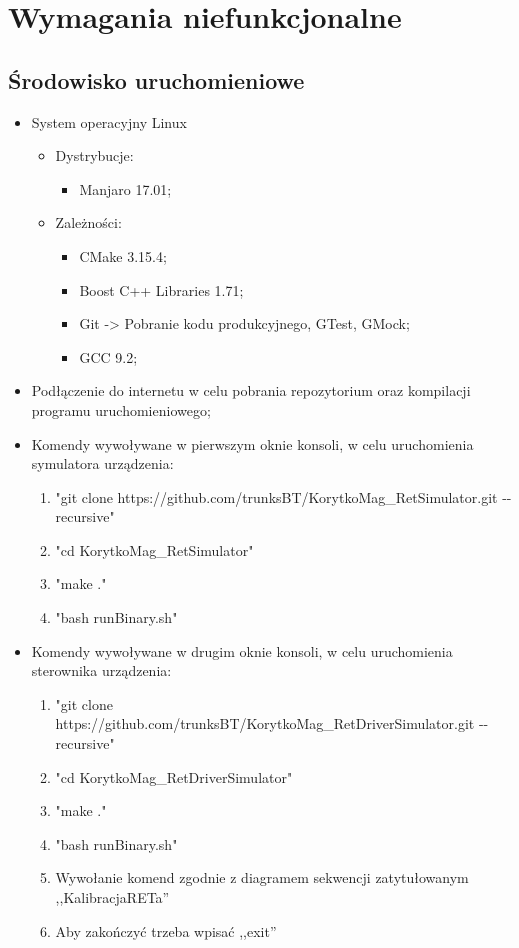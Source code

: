 \chapter{Wymagania niefunkcjonalne}
\section{Środowisko uruchomieniowe}
	\begin{itemize}
		\item System operacyjny Linux
			\begin{itemize}
				\item Dystrybucje:
				\begin{itemize}
					\item Manjaro 17.01;
				\end{itemize}
				\item Zależności:
					\begin{itemize}
						\item CMake 3.15.4;
						\item Boost C++ Libraries 1.71;
						\item Git -> Pobranie kodu produkcyjnego, GTest, GMock;
						\item GCC 9.2;
					\end{itemize}
			\end{itemize}
		\item Podłączenie do internetu w celu pobrania repozytorium oraz kompilacji programu uruchomieniowego;
		\item Komendy wywoływane w pierwszym oknie konsoli, w celu uruchomienia symulatora urządzenia:
		\begin{enumerate}
			\item "git clone https://github.com/trunksBT/KorytkoMag\_RetSimulator.git -{}-recursive"
			\item "cd KorytkoMag\_RetSimulator"
			\item "make ."
			\item "bash runBinary.sh"
		\end{enumerate}
		\item Komendy wywoływane w drugim oknie konsoli, w celu uruchomienia sterownika urządzenia:
		\begin{enumerate}
			\item "git clone https://github.com/trunksBT/KorytkoMag\_RetDriverSimulator.git -{}-recursive"
			\item "cd KorytkoMag\_RetDriverSimulator"
			\item "make ."
			\item "bash runBinary.sh"
			\item Wywołanie komend zgodnie z diagramem sekwencji zatytułowanym ,,KalibracjaRETa''
			\item Aby zakończyć trzeba wpisać ,,exit''
		\end{enumerate}
	\end{itemize}
